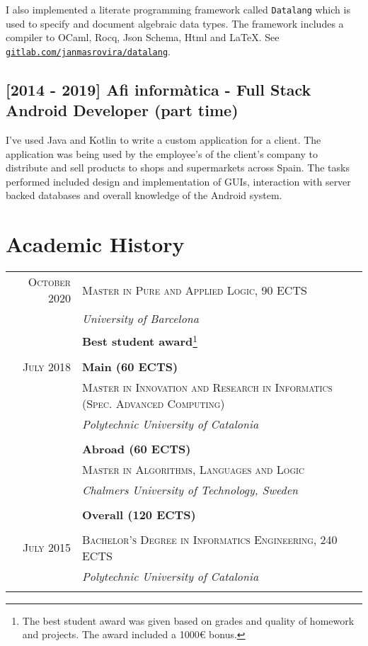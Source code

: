 \documentclass[11pt]{article}
\begin{document}
I also implemented a literate programming framework called \texttt{Datalang}
which is used to specify and document algebraic data types. The framework
includes a compiler to OCaml, Rocq, Json Schema, Html and LaTeX. See
\href{https://gitlab.com/janmasrovira/datalang}{\texttt{gitlab.com/janmasrovira/datalang}}.

\subsection*{[2014 - 2019] Afi informàtica - Full Stack Android Developer (part time)}
I've used Java and Kotlin to write a custom application for a client. The
application was being used by the employee's of the client's company to
distribute and sell products to shops and supermarkets across Spain. The tasks
performed included design and implementation of GUIs, interaction with server
backed databases and overall knowledge of the Android system.

\section{Academic History}

\begin{tabular}{r|p{11cm}}
  \textsc{October 2020} & \textsc{Master in Pure and Applied Logic, 90 ECTS} \\
 & \emph{University of Barcelona}\\
                        & \textbf{Best student award}\footnote{The best student award was given based on grades and quality
                            of homework and projects. The award included a 1000€ bonus.} \\
\multicolumn{2}{c}{} \\

  \textsc{July 2018} & \textbf{Main (60 ECTS)} \\
                        & \textsc{Master in Innovation and Research in Informatics (Spec. Advanced Computing)} \\
                        & \emph{Polytechnic University of Catalonia} \\
                         \\
 & \textbf{Abroad (60 ECTS)}  \\
  & \textsc{Master in Algorithms, Languages and Logic} \\
                        & \emph{Chalmers University of Technology, Sweden} \\
                        \\
                        & \textbf{Overall (120 ECTS)}  \\
  \multicolumn{2}{c}{} \\

  \textsc{July 2015} & \textsc{Bachelor's Degree in Informatics Engineering, 240 ECTS} \\
               & \emph{Polytechnic University of Catalonia}\\
  \multicolumn{2}{c}{} \\
\end{tabular}
\end{document}
